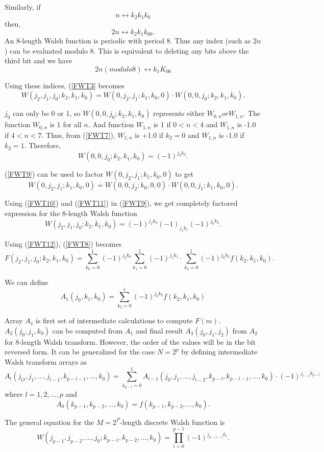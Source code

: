 Similarly, if
\[
n \leftrightarrow k_2k_1k_0
\]
then,
\[
2n \leftrightarrow k_2k_1k_00.
\]
An 8-length Walsh function is periodic with period 8. Thus any index (such as $2n$) can be evaluated modulo 8. This is equivalent to deleting any bits above the third bit and we have 
\[
2n(modulo 8) \leftrightarrow k_1K_00
\]

Using these indices, (\ref{FWT3} becomes
\begin{equation}
\label{FWT9}
W(j_2,j_1,j_0;k_2,k_1,k_0) = W(0,j_2,j_1;k_1,k_0,0) \cdot W(0,0,j_0;k_2,k_1,k_0).
\end{equation}

$j_0$ can only be 0 or 1, so $W(0,0,j_0; k_2, k_1, k_0)$ represents either $W_{0,n} or W_{1,n}$. The function $W_{0,n}$ is 1 for all $n$. And function $W_{1,n}$ is 1 if $0<n<4$ and $W_{1,n}$ is -1.0 if $4<n<7$. Thus, from (\ref{FWT7}), $W_{1,n}$ is +1.0 if $k_2=0$ and $W_{1,n}$ is -1.0 if $k_2 = 1$. Therefore, 
\begin{equation}
\label{FWT10}
W(0,0,j_0;k_2,k_1,k_0) = (-1)^{j_0k_2}.
\end{equation}

(\ref{FWT9}) can be used to factor $W(0,j_2,j_1;k_1,k_0,0)$ to get
\begin{equation}
\label{FWT11}
W(0,j_2,j_1;k_1,k_0,0) = W(0,0,j_2;k_0,0,0) \cdot W(0,0,j_1;k_1,k_0,0).
\end{equation}

Using (\ref{FWT10}) and (\ref{FWT11}) in (\ref{FWT9}), we get completely factored expression for the 8-length Walsh function
\begin{equation}
\label{FWT12}
W(j_2,j_1,j_0;k_2,k_1,k_0) = (-1)^{j_2k_0}(-1)_{j_1k_1}(-1)^{j_0k_2}.
\end{equation}

Using (\ref{FWT12}), (\ref{FWT8}) becomes 
\begin{equation}
\label{FWT13}
F(j_2,j_1,j_0;k_2,k_1,k_0) = \sum\limits_{k_0=0}^1 (-1)^{j_2k_0} \sum\limits_{k_1=0}^1 (-1)^{j_1k_1}  \cdot  \sum\limits_{k_2=0}^1 (-1)^{j_0k_2} f(k_2,k_1,k_0).
\end{equation}

We can define
\begin{equation}
\label{FWT14}
A_1(j_0,k_1,k_0) = \sum\limits_{k_2=0}^1 (-1)^{j_0k_2} f(k_2,k_1,k_0)
\end{equation}

Array $A_1$ is first set of intermediate calculations to compute $F(m)$. $A_2(j_0,j_1,k_0)$ can be computed from $A_1$ and final result $A_3(j_0,j_1,j_2)$ from $A_2$ for 8-length Walsh transform. However, the order of the values will be in the bit reversed form. It can be generalized for the case $N = 2^p$ by defining intermediate Walsh transform arrays as
\begin{equation}
\label{FWT15}
A_l(j_O,j_1,...,j_{l-1},k_{p-l-1},...,k_0) = \sum\limits_{k_{p-l}=0}^1 A_{l-1}(j_0,j_1,...,j_{l-2},k_{p-l},k_{p-l-1},...,k_0) \cdot (-1)^{j_{l-1}k_{p-l}}
\end{equation}
where $l = 1,2,...,p$ and 
\begin{equation}
\label{FWT16}
A_0(k_{p-1},k_{p-2},...,k_0) = f(k_{p-1},k_{p-2},...,k_0).
\end{equation}

The general equation for the $M= 2^P$-length discrete Walsh function is 
\[
W(j_{p-1},j_{p-2},...,j_0;k_{p-1},k_{p-2},...,k_0) = \prod_{i=0}^{p-1} (-1)^{j_{p-1-i}k_i}.
\]



